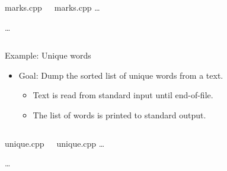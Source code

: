 {

\begin{frame}
\begin{columns}[T]
\begin{block}{marks.cpp}

\ldots
\end{block}

\begin{block}{marks.cpp}
\ldots

\end{block}
\end{columns}
\end{frame}

}

\begin{frame}[t]{Example: Unique words}
\begin{itemize}
  \item \alert{Goal}: Dump the sorted list of unique words from a text.
    \begin{itemize}
      \item Text is read from standard input until end-of-file.
      \item The list of words is printed to standard output.
    \end{itemize}
\end{itemize}
\end{frame}


\begin{frame}
\begin{columns}[T]

\begin{block}{unique.cpp}

\ldots
\end{block}

\begin{block}{unique.cpp}
\ldots

\end{block}
\end{columns}
\end{frame}

